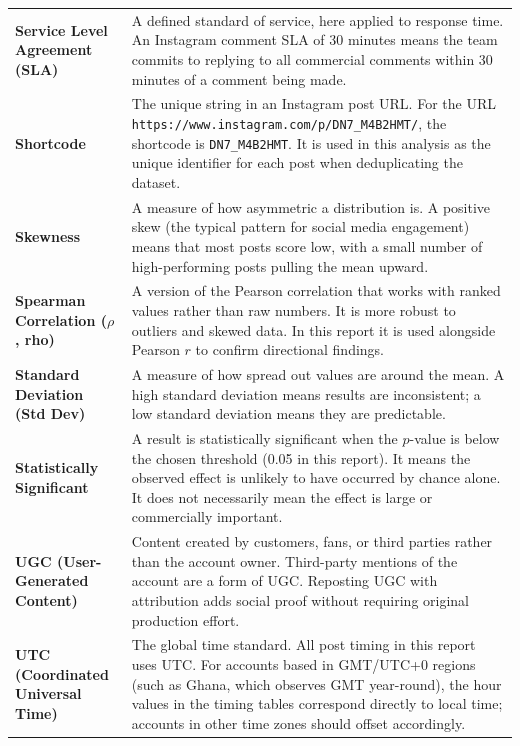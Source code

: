 \begin{longtable}{@{}L{4cm} L{11.5cm}@{}}
\textbf{Service Level Agreement (SLA)} &
A defined standard of service, here applied to response time. An Instagram comment
SLA of 30 minutes means the team commits to replying to all commercial comments
within 30 minutes of a comment being made. \\[4pt]

\textbf{Shortcode} &
The unique string in an Instagram post URL. For the URL
\texttt{https://www.instagram.com/p/DN7\_M4B2HMT/}, the shortcode is
\texttt{DN7\_M4B2HMT}. It is used in this analysis as the unique identifier for
each post when deduplicating the dataset. \\[4pt]

\textbf{Skewness} &
A measure of how asymmetric a distribution is. A positive skew (the typical
pattern for social media engagement) means that most posts score low, with a small
number of high-performing posts pulling the mean upward. \\[4pt]

\textbf{Spearman Correlation ($\rho$, rho)} &
A version of the Pearson correlation that works with ranked values rather than raw
numbers. It is more robust to outliers and skewed data. In this report it is used
alongside Pearson $r$ to confirm directional findings. \\[4pt]

\textbf{Standard Deviation (Std Dev)} &
A measure of how spread out values are around the mean. A high standard deviation
means results are inconsistent; a low standard deviation means they are
predictable. \\[4pt]

\textbf{Statistically Significant} &
A result is statistically significant when the $p$-value is below the chosen
threshold (0.05 in this report). It means the observed effect is unlikely to have
occurred by chance alone. It does not necessarily mean the effect is large or
commercially important. \\[4pt]

\textbf{UGC (User-Generated Content)} &
Content created by customers, fans, or third parties rather than the account
owner. Third-party mentions of the account are a form of UGC. Reposting UGC with
attribution adds social proof without requiring original production effort. \\[4pt]

\textbf{UTC (Coordinated Universal Time)} &
The global time standard. All post timing in this report uses UTC. For accounts
based in GMT/UTC+0 regions (such as Ghana, which observes GMT year-round), the
hour values in the timing tables correspond directly to local time; accounts in
other time zones should offset accordingly. \\[4pt]


\end{longtable}
